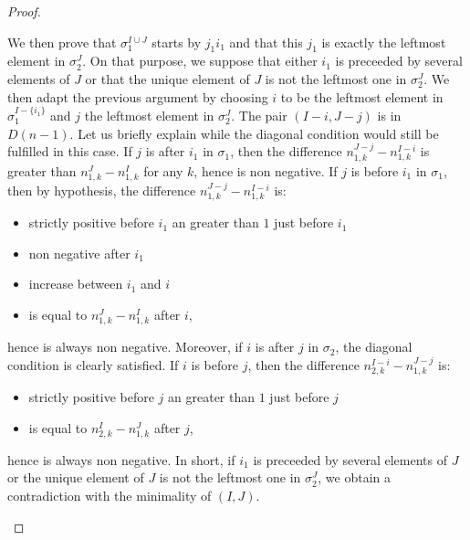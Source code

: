 \documentclass[11pt]{amsart}
\theoremstyle{definition}
\theoremstyle{remark}
\numberwithin{equation}{section}
\newcommand{\0}{\color{blue}{\mathsf{0}}}
\begin{document}
\begin{proof}
\begin{itemize}
We then prove that $\sigma^{I \cup J}_1$ starts by $j_1 i_1$ and that this $j_1$ is exactly the leftmost element in  $\sigma^{J}_2$. On that purpose, we suppose that either  $i_1$ is preceeded by several elements of $J$ or that the unique element of $J$ is not the leftmost one in $\sigma^{J}_2$. We then adapt the previous argument by choosing $i$ to be the leftmost element in $\sigma^{I-\{i_1\}}_1$ and $j$ the leftmost element in $\sigma^{J}_2$. The pair $(I-i,J-j)$ is in $D(n-1)$. Let us briefly explain while  the diagonal condition would still be fulfilled in this case. If $j$ is after $i_1$ in $\sigma_1$, then the difference $n_{1,k}^{J-j}-n_{1,k}^{I-i}$ is greater than $n_{1,k}^{J}-n_{1,k}^{I}$ for any $k$, hence is non negative. If $j$ is before $i_1$ in $\sigma_1$, then by hypothesis, the difference $n_{1,k}^{J-j}-n_{1,k}^{I-i}$ is:
\begin{itemize}
\item strictly positive before $i_1$ an greater than $1$ just before $i_1$
\item non negative after $i_1$
\item increase between $i_1$ and $i$
\item is equal to $n_{1,k}^{J}-n_{1,k}^{I}$ after $i$,
\end{itemize} 
hence is always non negative.
Moreover, if $i$ is after $j$ in $\sigma_2$, the diagonal condition is clearly satisfied. If $i$ is before $j$, then the difference $n_{2,k}^{I-i}-n_{1,k}^{J-j}$ is:
\begin{itemize}
\item strictly positive before $j$ an greater than $1$ just before $j$
\item is equal to $n_{2,k}^{I}-n_{1,k}^{J}$ after $j$,
\end{itemize} 
hence is always non negative. In short, if $i_1$ is preceeded by several elements of $J$ or the unique element of $J$ is not the leftmost one in $\sigma^{J}_2$, we obtain a contradiction with the minimality of $(I,J)$.


\end{itemize}
\end{proof}
\end{document}
